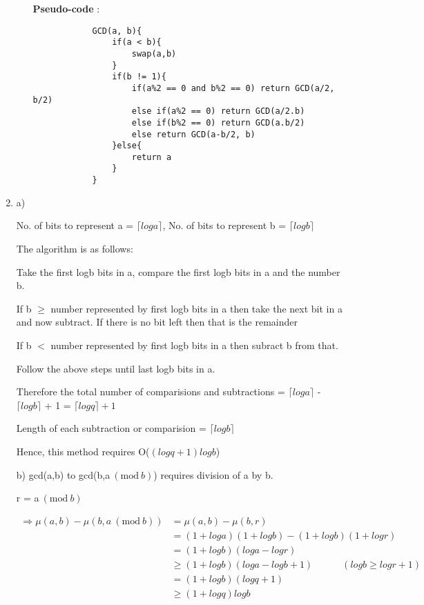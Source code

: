 \documentclass[12pt]{article}
\newcommand{\Mod}[1]{\ (\mathrm{mod}\ #1)}
\begin{document}
\begin{enumerate}
\begin{enumerate}
        \textbf{Pseudo-code} :
        \begin{verbatim}
            GCD(a, b){
                if(a < b){
                    swap(a,b)
                }
                if(b != 1){
                    if(a%2 == 0 and b%2 == 0) return GCD(a/2, b/2)
                    else if(a%2 == 0) return GCD(a/2.b)
                    else if(b%2 == 0) return GCD(a.b/2)
                    else return GCD(a-b/2, b)
                }else{
                    return a
                }
            }    
        \end{verbatim}
    \end{enumerate}
    \item 
    a) 
    
    No. of bits to represent a = $ \lceil {loga} \rceil $,
    No. of bits to represent b = $ \lceil {logb} \rceil $
    
    The algorithm is as follows:
    
    Take the first logb bits in a, compare the first logb bits in a and the number b. 
    
    If b $\geq$ number represented by first logb bits in a then take the next bit in a and now subtract. If there is no bit left then that is the remainder
    
    If b $<$ number represented by first logb bits in a then subract b from that.
    
    Follow the above steps until last logb bits in a.
    
    Therefore the total number of comparisions and subtractions = $ \lceil {loga} \rceil $ - $ \lceil {logb} \rceil $ + 1 = $ \lceil {logq} \rceil + 1$
    
    Length of each subtraction or comparision = $ \lceil {logb} \rceil $
    
    Hence, this method requires O($ ( {logq} + 1) {logb} $)
    
    b) gcd(a,b) to gcd(b,a$\Mod b$) requires division of a by b.
    
    r = a$\Mod b$

    \begin{equation}
        \begin{split}
            \Rightarrow \mu(a,b) - \mu(b,a\Mod b) & = \mu(a,b) - \mu(b,r) \\
            & = (1+loga)(1+logb) - (1+logb)(1+logr) \\
            & = (1+logb)(loga-logr) \\
            & \geq (1+logb)(loga-logb+1) \quad \quad \quad (logb \geq logr+1) \\
            & = (1+logb)(logq+1) \\
            & \geq (1+logq)logb
        \end{split}
    \end{equation}
    

\end{enumerate}
\end{document}

